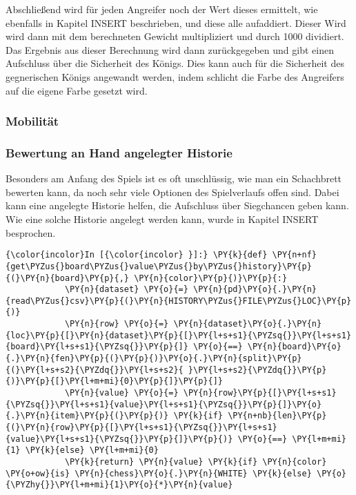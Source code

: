Abschließend wird für jeden Angreifer noch der Wert dieses ermittelt,
wie ebenfalls in Kapitel INSERT beschrieben, und diese alle aufaddiert.
Dieser Wird wird dann mit dem berechneten Gewicht multipliziert und
durch 1000 dividiert. Das Ergebnis aus dieser Berechnung wird dann
zurückgegeben und gibt einen Aufschluss über die Sicherheit des Königs.
Dies kann auch für die Sicherheit des gegnerischen Königs angewandt
werden, indem schlicht die Farbe des Angreifers auf die eigene Farbe
gesetzt wird.

    \subsubsection{Mobilität}\label{mobilituxe4t}

    \subsubsection{Bewertung an Hand angelegter
Historie}\label{bewertung-an-hand-angelegter-historie}

Besonders am Anfang des Spiels ist es oft unschlüssig, wie man ein
Schachbrett bewerten kann, da noch sehr viele Optionen des Spielverlaufs
offen sind. Dabei kann eine angelegte Historie helfen, die Aufschluss
über Siegchancen geben kann. Wie eine solche Historie angelegt werden
kann, wurde in Kapitel INSERT besprochen.

    \begin{Verbatim}[commandchars=\\\{\}]
{\color{incolor}In [{\color{incolor} }]:} \PY{k}{def} \PY{n+nf}{get\PYZus{}board\PYZus{}value\PYZus{}by\PYZus{}history}\PY{p}{(}\PY{n}{board}\PY{p}{,} \PY{n}{color}\PY{p}{)}\PY{p}{:}
            \PY{n}{dataset} \PY{o}{=} \PY{n}{pd}\PY{o}{.}\PY{n}{read\PYZus{}csv}\PY{p}{(}\PY{n}{HISTORY\PYZus{}FILE\PYZus{}LOC}\PY{p}{)}
            \PY{n}{row} \PY{o}{=} \PY{n}{dataset}\PY{o}{.}\PY{n}{loc}\PY{p}{[}\PY{n}{dataset}\PY{p}{[}\PY{l+s+s1}{\PYZsq{}}\PY{l+s+s1}{board}\PY{l+s+s1}{\PYZsq{}}\PY{p}{]} \PY{o}{==} \PY{n}{board}\PY{o}{.}\PY{n}{fen}\PY{p}{(}\PY{p}{)}\PY{o}{.}\PY{n}{split}\PY{p}{(}\PY{l+s+s2}{\PYZdq{}}\PY{l+s+s2}{ }\PY{l+s+s2}{\PYZdq{}}\PY{p}{)}\PY{p}{[}\PY{l+m+mi}{0}\PY{p}{]}\PY{p}{]}
            \PY{n}{value} \PY{o}{=} \PY{n}{row}\PY{p}{[}\PY{l+s+s1}{\PYZsq{}}\PY{l+s+s1}{value}\PY{l+s+s1}{\PYZsq{}}\PY{p}{]}\PY{o}{.}\PY{n}{item}\PY{p}{(}\PY{p}{)} \PY{k}{if} \PY{n+nb}{len}\PY{p}{(}\PY{n}{row}\PY{p}{[}\PY{l+s+s1}{\PYZsq{}}\PY{l+s+s1}{value}\PY{l+s+s1}{\PYZsq{}}\PY{p}{]}\PY{p}{)} \PY{o}{==} \PY{l+m+mi}{1} \PY{k}{else} \PY{l+m+mi}{0}
            \PY{k}{return} \PY{n}{value} \PY{k}{if} \PY{n}{color} \PY{o+ow}{is} \PY{n}{chess}\PY{o}{.}\PY{n}{WHITE} \PY{k}{else} \PY{o}{\PYZhy{}}\PY{l+m+mi}{1}\PY{o}{*}\PY{n}{value}
\end{Verbatim}

